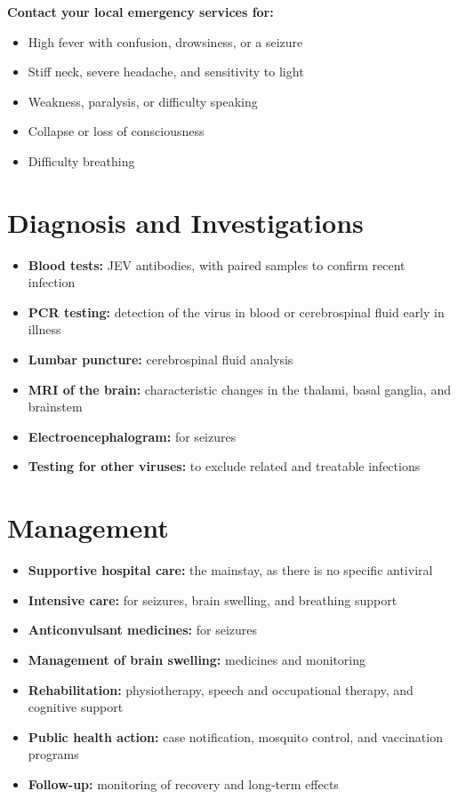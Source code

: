 \textbf{Contact your local emergency services for:}
\begin{itemize}
    \item High fever with confusion, drowsiness, or a seizure
    \item Stiff neck, severe headache, and sensitivity to light
    \item Weakness, paralysis, or difficulty speaking
    \item Collapse or loss of consciousness
    \item Difficulty breathing
\end{itemize}

\section*{Diagnosis and Investigations}
\begin{itemize}
    \item \textbf{Blood tests:} JEV antibodies, with paired samples to confirm recent infection
    \item \textbf{PCR testing:} detection of the virus in blood or cerebrospinal fluid early in illness
    \item \textbf{Lumbar puncture:} cerebrospinal fluid analysis
    \item \textbf{MRI of the brain:} characteristic changes in the thalami, basal ganglia, and brainstem
    \item \textbf{Electroencephalogram:} for seizures
    \item \textbf{Testing for other viruses:} to exclude related and treatable infections
\end{itemize}

\section*{Management}
\begin{itemize}
    \item \textbf{Supportive hospital care:} the mainstay, as there is no specific antiviral
    \item \textbf{Intensive care:} for seizures, brain swelling, and breathing support
    \item \textbf{Anticonvulsant medicines:} for seizures
    \item \textbf{Management of brain swelling:} medicines and monitoring
    \item \textbf{Rehabilitation:} physiotherapy, speech and occupational therapy, and cognitive support
    \item \textbf{Public health action:} case notification, mosquito control, and vaccination programs
    \item \textbf{Follow-up:} monitoring of recovery and long-term effects
\end{itemize}

